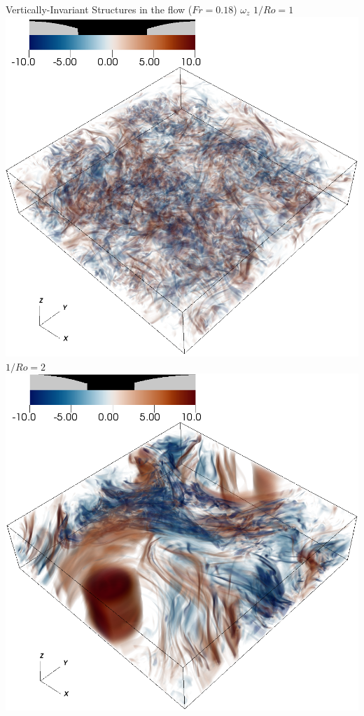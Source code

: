 \documentclass[aspecttatio=169]{beamer}
\begin{document}
\begin{frame}{Vertically-Invariant Structures in the flow ($Fr = 0.18$)}
    \centering
        $\omega_z$
    \emp
        \centering
        $1/Ro = 1$
        \includegraphics[width=.95\textwidth]{images/vortz_Om0.5_vr2.png}
    \emp
        \centering
        $1/Ro = 2$
        \includegraphics[width=.95\textwidth]{images/vortz_Om2_vr2.png}

\end{frame}
\end{document}
